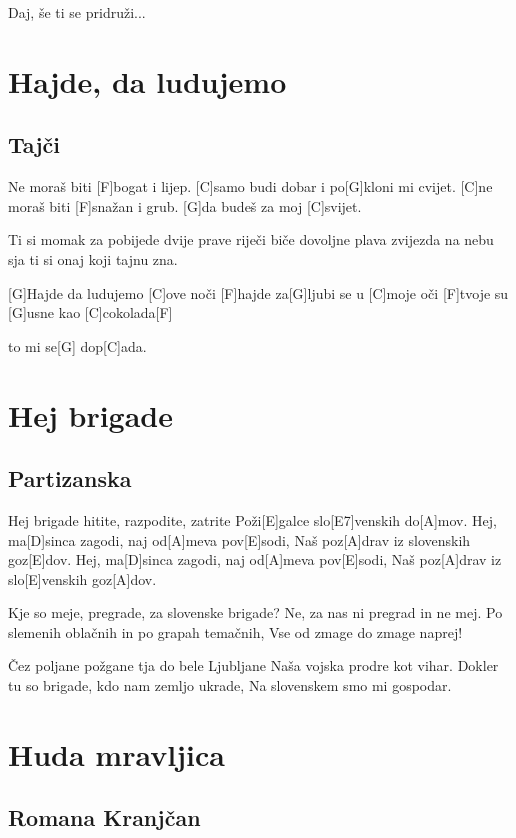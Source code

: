 \documentclass[a4paper,12pt]{article}
\begin{document}
\begin{multicols}{2}
\begin{guitar}
Daj, še ti se pridruži... 

\end{guitar}
\section{Hajde, da ludujemo}
\subsection*{Tajči}
\begin{guitar}
[C]Ne moraš biti [F]bogat i lijep.
[C]samo budi dobar i po[G]kloni mi cvijet. 
[C]ne moraš biti [F]snažan i grub.
[G]da budeš za moj [C]svijet.

 
Ti si momak za pobijede 
dvije prave riječi biče dovoljne
plava zvijezda na nebu sja 
ti si onaj koji tajnu zna.


[G]Hajde da ludujemo [C]ove noči
[F]hajde za[G]ljubi se u [C]moje oči  
[F]tvoje su [G]usne kao [C]cokolada[F]

to mi se[G] dop[C]ada.

\end{guitar}
\section{Hej brigade}
\subsection*{Partizanska}
\begin{guitar}
[A]Hej brigade hitite, razpodite, zatrite
Poži[E]galce slo[E7]venskih do[A]mov.
Hej, ma[D]sinca zagodi, naj od[A]meva pov[E]sodi,
Naš poz[A]drav iz slovenskih goz[E]dov.
Hej, ma[D]sinca zagodi, naj od[A]meva pov[E]sodi,
Naš poz[A]drav iz slo[E]venskih goz[A]dov.

Kje so meje, pregrade, za slovenske brigade?
Ne, za nas ni pregrad in ne mej.
Po slemenih oblačnih in po grapah temačnih,
Vse od zmage do zmage naprej!

Čez poljane požgane tja do bele Ljubljane
Naša vojska prodre kot vihar.
Dokler tu so brigade, kdo nam zemljo ukrade,
Na slovenskem smo mi gospodar.

\end{guitar}
\section{Huda mravljica}
\subsection*{Romana Kranjčan}
\begin{guitar}


\end{guitar}
\end{multicols}
\end{document}
